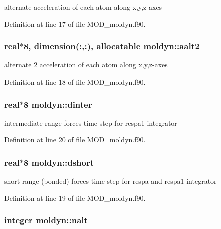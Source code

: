 alternate acceleration of each atom along x,y,z-\/axes 



Definition at line 17 of file M\-O\-D\-\_\-moldyn.\-f90.

\hypertarget{classmoldyn_a02162eed7467865a18a4b4aec93f7029}{
\subsubsection[{aalt2}]{\setlength{\rightskip}{0pt plus 5cm}real$\ast$8, dimension(\-:,\-:), allocatable moldyn\-::aalt2}}\label{classmoldyn_a02162eed7467865a18a4b4aec93f7029}


alternate 2 acceleration of each atom along x,y,z-\/axes 



Definition at line 18 of file M\-O\-D\-\_\-moldyn.\-f90.

\hypertarget{classmoldyn_a1cd6fdf3c020c12a8195c47b37fa62d3}{
\subsubsection[{dinter}]{\setlength{\rightskip}{0pt plus 5cm}real$\ast$8 moldyn\-::dinter}}\label{classmoldyn_a1cd6fdf3c020c12a8195c47b37fa62d3}


intermediate range forces time step for respa1 integrator 



Definition at line 20 of file M\-O\-D\-\_\-moldyn.\-f90.

\hypertarget{classmoldyn_ac40f2c232407c85a02169ad2692ab755}{
\subsubsection[{dshort}]{\setlength{\rightskip}{0pt plus 5cm}real$\ast$8 moldyn\-::dshort}}\label{classmoldyn_ac40f2c232407c85a02169ad2692ab755}


short range (bonded) forces time step for respa and respa1 integrator 



Definition at line 19 of file M\-O\-D\-\_\-moldyn.\-f90.

\hypertarget{classmoldyn_aab13fe54485a53ad7bb8219186aff2e8}{
\subsubsection[{nalt}]{\setlength{\rightskip}{0pt plus 5cm}integer moldyn\-::nalt}}\label{classmoldyn_aab13fe54485a53ad7bb8219186aff2e8}


